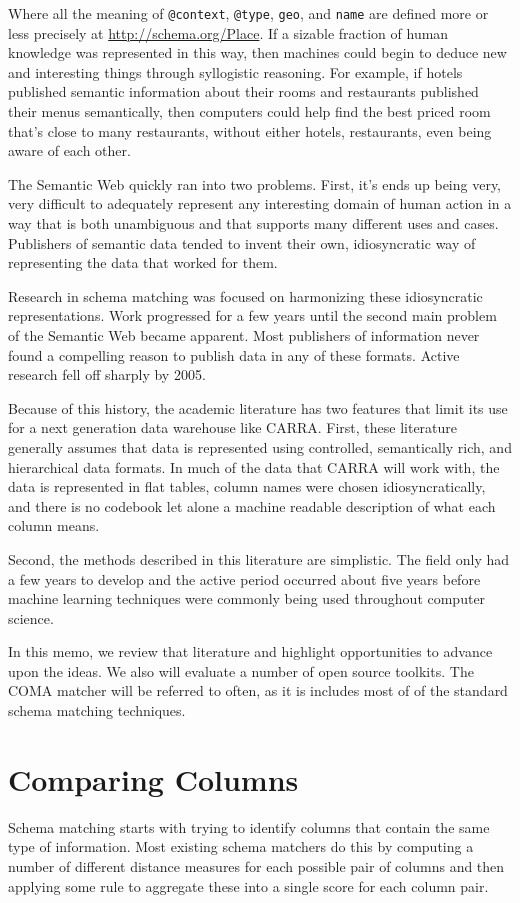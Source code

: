 \documentclass{datamade}
\theoremstyle{definition}
\theoremstyle{remark}
\begin{document}
Where all the meaning of \verb+@context+, \verb+@type+, \verb+geo+,
and \verb+name+ are defined more or less precisely at
\url{http://schema.org/Place}. If a sizable fraction of human
knowledge was represented in this way, then machines could begin to
deduce new and interesting things through syllogistic reasoning. For
example, if hotels published semantic information about their rooms
and restaurants published their menus semantically, then computers
could help find the best priced room that's close to many restaurants,
without either hotels, restaurants, even being aware of each other.

The Semantic Web quickly ran into two problems. First, it's ends up
being very, very difficult to adequately represent any interesting
domain of human action in a way that is both unambiguous and that
supports many different uses and cases. Publishers of semantic data
tended to invent their own, idiosyncratic way of representing the data
that worked for them.

Research in schema matching was focused on harmonizing these
idiosyncratic representations. Work progressed for a few years until
the second main problem of the Semantic Web became apparent. Most
publishers of information never found a compelling reason to publish
data in any of these formats. Active research fell off sharply by
2005.

Because of this history, the academic literature has two features that
limit its use for a next generation data warehouse like CARRA. First,
these literature generally assumes that data is represented using
controlled, semantically rich, and hierarchical data formats. In much
of the data that CARRA will work with, the data is represented in flat
tables, column names were chosen idiosyncratically, and there is no
codebook let alone a machine readable description of what each column
means.

Second, the methods described in this literature are simplistic. The
field only had a few years to develop and the active period occurred
about five years before machine learning techniques were commonly
being used throughout computer science.

In this memo, we review that literature and highlight opportunities to
advance upon the ideas. We also will evaluate a number of
open source toolkits. The COMA matcher \cite{coma} will be referred to
often, as it is includes most of of the standard schema matching
techniques.

\section*{Comparing Columns}
Schema matching starts with trying to identify columns that contain
the same type of information. Most existing schema matchers do this by
computing a number of different distance measures for each possible
pair of columns and then applying some rule to aggregate these into a
single score for each column pair. 
\end{document}
